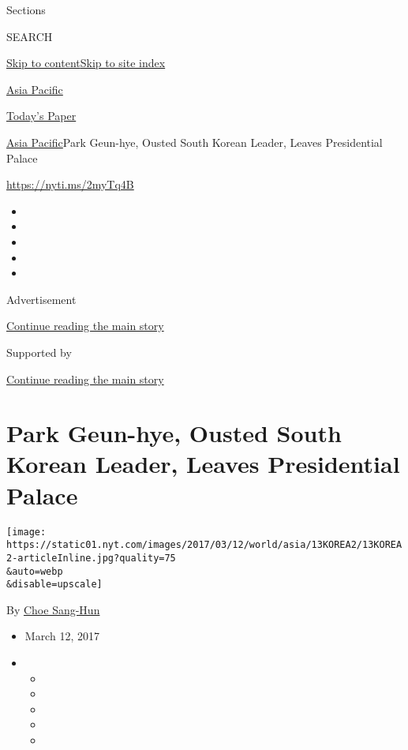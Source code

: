 Sections

SEARCH

\protect\hyperlink{site-content}{Skip to
content}\protect\hyperlink{site-index}{Skip to site index}

\href{https://www.nytimes.com/section/world/asia}{Asia Pacific}

\href{https://myaccount.nytimes.com/auth/login?response_type=cookie\&client_id=vi}{}

\href{https://www.nytimes.com/section/todayspaper}{Today's Paper}

\href{/section/world/asia}{Asia Pacific}\textbar{}Park Geun-hye, Ousted
South Korean Leader, Leaves Presidential Palace

\url{https://nyti.ms/2myTq4B}

\begin{itemize}
\item
\item
\item
\item
\item
\end{itemize}

Advertisement

\protect\hyperlink{after-top}{Continue reading the main story}

Supported by

\protect\hyperlink{after-sponsor}{Continue reading the main story}

\hypertarget{park-geun-hye-ousted-south-korean-leader-leaves-presidential-palace}{%
\section{Park Geun-hye, Ousted South Korean Leader, Leaves Presidential
Palace}\label{park-geun-hye-ousted-south-korean-leader-leaves-presidential-palace}}

\texttt{[image: https://static01.nyt.com/images/2017/03/12/world/asia/13KOREA2/13KOREA2-articleInline.jpg?quality=75\\\&auto=webp\\\&disable=upscale]}

By \href{http://www.nytimes.com/by/choe-sang-hun}{Choe Sang-Hun}

\begin{itemize}
\item
  March 12, 2017
\item
  \begin{itemize}
  \item
  \item
  \item
  \item
  \item
  \end{itemize}
\end{itemize}

